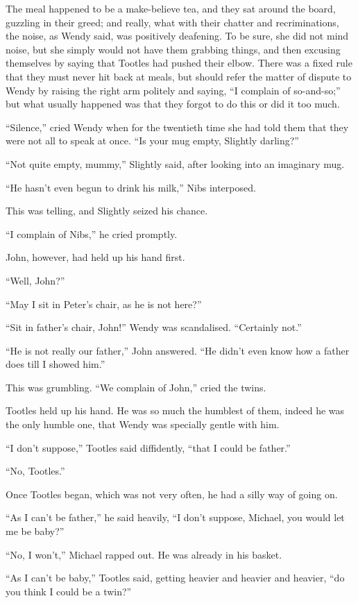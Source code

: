 The meal happened to be a make-believe tea,
and they sat around the board, guzzling in their greed;
and really, what with their chatter and recriminations,
the noise, as Wendy said, was positively deafening.
To be sure, she did not mind noise,
but she simply would not have them grabbing things,
and then excusing themselves by saying that Tootles had pushed their elbow.
There was a fixed rule that they must never hit back at meals,
but should refer the matter of dispute to Wendy by raising the right arm politely and saying,
“I complain of so-and-so;”
but what usually happened was that they forgot to do this or did it too much.

“Silence,” cried Wendy when for the twentieth time she had told them that they were not all to speak at once.
“Is your mug empty, Slightly darling?”

“Not quite empty, mummy,” Slightly said, after looking into an imaginary mug.

“He hasn’t even begun to drink his milk,” Nibs interposed.

This was telling, and Slightly seized his chance.

“I complain of Nibs,” he cried promptly.

John, however, had held up his hand first.

“Well, John?”

“May I sit in Peter’s chair, as he is not here?”

“Sit in father’s chair, John!”
Wendy was scandalised.
“Certainly not.”

“He is not really our father,” John answered.
“He didn’t even know how a father does till I showed him.”

This was grumbling.
“We complain of John,” cried the twins.

Tootles held up his hand.
He was so much the humblest of them,
indeed he was the only humble one, that Wendy was specially gentle with him.

“I don’t suppose,” Tootles said diffidently,
“that I could be father.”

“No, Tootles.”

Once Tootles began, which was not very often, he had a silly way of going on.

“As I can’t be father,” he said heavily,
“I don’t suppose, Michael, you would let me be baby?”

“No, I won’t,” Michael rapped out.
He was already in his basket.

“As I can’t be baby,” Tootles said, getting heavier and heavier and heavier,
“do you think I could be a twin?”

